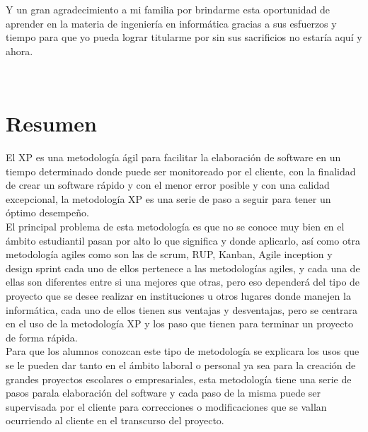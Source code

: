 \documentclass[letterpaper,oneside,openany,11pt]{book}
\begin{document}
Y un gran agradecimiento a mi familia por brindarme esta oportunidad de aprender en la materia de ingeniería en informática gracias a sus esfuerzos y tiempo para que yo pueda lograr titularme por sin sus sacrificios no estaría aquí y ahora.\\
\thispagestyle{empty} %

\newpage
$\ $
\thispagestyle{empty} %

\chapter*{Resumen} %
\noindent El XP es una metodología ágil para facilitar la elaboración de software en un tiempo determinado donde puede ser monitoreado por el cliente, con la finalidad de crear un software rápido y con el menor error posible y con una calidad excepcional, la metodología XP es una serie de paso a seguir para tener un óptimo desempeño.\\

El principal problema de esta metodología es que no se conoce muy bien en el ámbito estudiantil pasan por alto lo que significa y donde aplicarlo, así como otra metodología agiles como son las de scrum, RUP, Kanban, Agile inception y design sprint cada uno de ellos pertenece a las metodologías agiles, y cada una de ellas son diferentes entre si una mejores que otras, pero eso dependerá del tipo de proyecto que se desee realizar en instituciones u otros lugares donde manejen la informática, cada uno de ellos tienen sus ventajas y desventajas, pero se centrara en el uso de la metodología XP y los paso que tienen para terminar un proyecto de forma rápida.\\

Para que los alumnos conozcan este tipo de metodología se explicara los usos que se le pueden dar tanto en el ámbito laboral o personal ya sea para la creación de grandes proyectos escolares o empresariales, esta metodología tiene una serie de pasos parala elaboración del software y cada paso de la misma puede ser supervisada por el cliente para correcciones o modificaciones que se vallan ocurriendo al cliente en el transcurso del proyecto.\\
\end{document}
